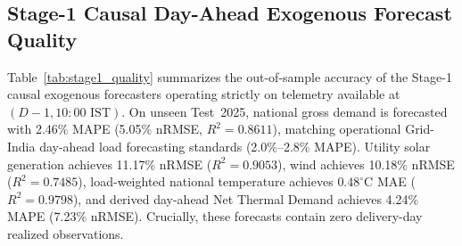 \documentclass[journal,10pt,twocolumn]{IEEEtran}
\begin{document}
\subsection{Stage-1 Causal Day-Ahead Exogenous Forecast Quality}
Table~\ref{tab:stage1_quality} summarizes the out-of-sample accuracy of the Stage-1 causal exogenous forecasters operating strictly on telemetry available at $(D-1, 10:00\text{~IST})$. On unseen Test~2025, national gross demand is forecasted with 2.46\% MAPE (5.05\% nRMSE, $R^2 = 0.8611$), matching operational Grid-India day-ahead load forecasting standards (2.0\%--2.8\% MAPE). Utility solar generation achieves 11.17\% nRMSE ($R^2 = 0.9053$), wind achieves 10.18\% nRMSE ($R^2 = 0.7485$), load-weighted national temperature achieves $0.48^\circ\text{C}$ MAE ($R^2 = 0.9798$), and derived day-ahead Net Thermal Demand achieves 4.24\% MAPE (7.23\% nRMSE). Crucially, these forecasts contain zero delivery-day realized observations.

\begin{table}[!t]
\centering
\caption{Out-of-Sample Accuracy of Stage-1 Strictly Causal Day-Ahead Exogenous Forecast Reconstructors (Cutoff $\le D-1$ 10:00 AM IST)}
\label{tab:stage1_quality}
\renewcommand{\arraystretch}{1.18}
\setlength{\tabcolsep}{5pt}
\end{table}
\end{document}
